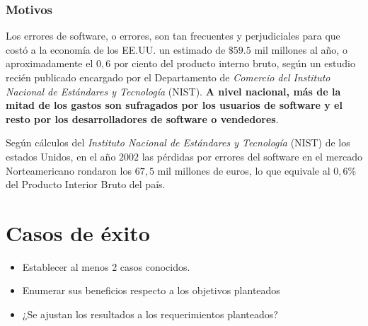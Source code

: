 \documentclass[titlepage,a4paper,twoside]{article}
\begin{document}
   
    \subsubsection{Motivos}
   
    
    Los errores de software, o errores, son tan frecuentes y perjudiciales para que costó a la economía de los EE.UU. un estimado de $\$ 59.5$ mil millones al año, o aproximadamente el $0,6$ por ciento del producto interno bruto, según un estudio recién publicado encargado por el Departamento de \textit{Comercio del Instituto Nacional de Estándares y Tecnología} (NIST). \textbf{A nivel nacional, más de la mitad de los gastos son sufragados por los usuarios de software y el resto por los desarrolladores de software o vendedores}.
    
    Según cálculos del \textit{Instituto Nacional de Estándares y Tecnología} (NIST) de los  estados Unidos, en el año $2002$ las pérdidas por errores del software en el mercado Norteamericano rondaron los $67,5$ mil millones de euros, lo que equivale al $0,6\%$ del Producto Interior Bruto del país.    
    
   
   

    \section{Casos de éxito}
    
    \begin{itemize}
    	\item Establecer al menos 2 casos conocidos.
    	\item Enumerar sus beneficios respecto a los objetivos planteados
    	\item ¿Se ajustan los resultados a los requerimientos planteados?
    \end{itemize}
\end{document}
